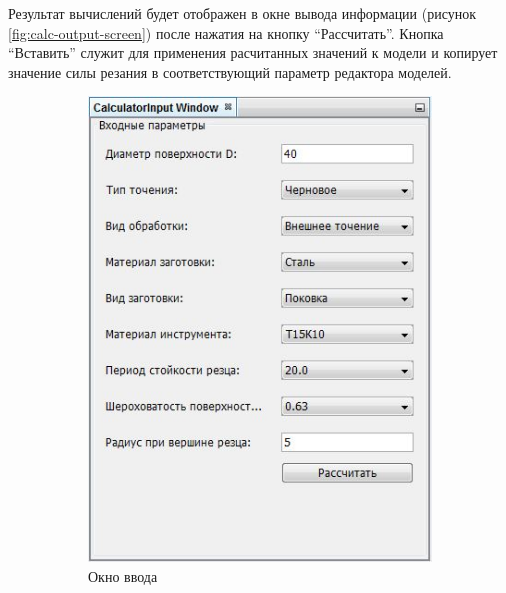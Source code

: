 \documentclass[14pt,oneside,final]{extreport}
\begin{document}
	Результат вычислений будет отображен в окне вывода информации (рисунок \ref{fig:calc-output-screen}) после нажатия на кнопку ``Рассчитать''. Кнопка ``Вставить'' служит для применения расчитанных значений к модели и копирует значение силы резания в соответствующий параметр редактора моделей. 	
	\begin{figure}[h!]
		\centering
		\begin{subfigure}[t]{0.5\textwidth}
			\centering
			\includegraphics[width=1\textwidth]{img/calc-input-screen}
			\caption{Окно ввода} \label{fig:calc-input-screen}
		\end{subfigure}%
		~ 
		\begin{subfigure}[t]{0.5\textwidth}
			\centering

\end{subfigure}
\end{figure}
\end{document}
